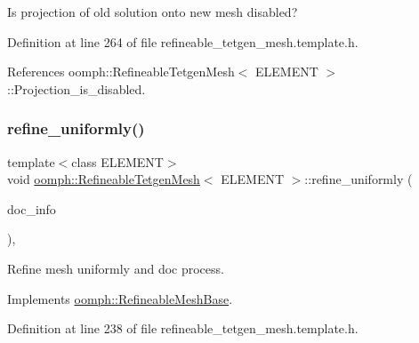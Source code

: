Is projection of old solution onto new mesh disabled? 



Definition at line 264 of file refineable\+\_\+tetgen\+\_\+mesh.\+template.\+h.



References oomph\+::\+Refineable\+Tetgen\+Mesh$<$ E\+L\+E\+M\+E\+N\+T $>$\+::\+Projection\+\_\+is\+\_\+disabled.

\mbox{\label{classoomph_1_1RefineableTetgenMesh_a5ddc94b2545c82bfb2795583f9b98db2}} 
\subsubsection{\texorpdfstring{refine\+\_\+uniformly()}{refine\_uniformly()}}
{\footnotesize\ttfamily template$<$class E\+L\+E\+M\+E\+NT$>$ \\
void \hyperlink{classoomph_1_1RefineableTetgenMesh}{oomph\+::\+Refineable\+Tetgen\+Mesh}$<$ E\+L\+E\+M\+E\+NT $>$\+::refine\+\_\+uniformly (\begin{DoxyParamCaption}\item[{\hyperlink{classoomph_1_1DocInfo}{Doc\+Info} \&}]{doc\+\_\+info }\end{DoxyParamCaption})\hspace{0.3cm}{\ttfamily [inline]}, {\ttfamily [virtual]}}



Refine mesh uniformly and doc process. 



Implements \hyperlink{classoomph_1_1RefineableMeshBase_afe5810e718ce1939f3f81e3eb5743768}{oomph\+::\+Refineable\+Mesh\+Base}.



Definition at line 238 of file refineable\+\_\+tetgen\+\_\+mesh.\+template.\+h.

\mbox{\label{classoomph_1_1RefineableTetgenMesh_add609c3184ffa1786e183f4c6dc24a57}} 
